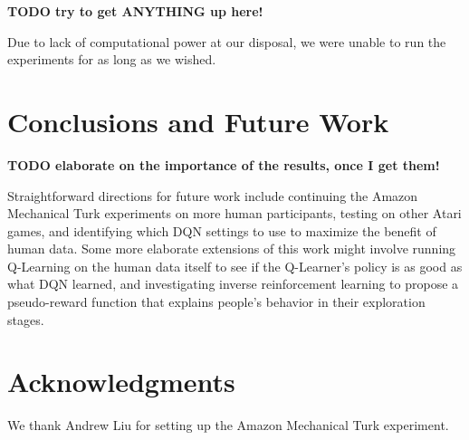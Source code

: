 \documentclass[letterpaper, 10 pt, conference]{ieeeconf}  %
\begin{document}
\textbf{TODO try to get ANYTHING up here!}

Due to lack of computational power at our disposal, we were unable to run the experiments for as
long as we wished.


\section{Conclusions and Future Work}\label{sec:conclusions}

\textbf{TODO elaborate on the importance of the results, once I get them!} 

Straightforward directions for future work include continuing the Amazon Mechanical Turk experiments
on more human participants, testing on other Atari games, and identifying which DQN settings to use
to maximize the benefit of human data. Some more elaborate extensions of this work might involve
running Q-Learning on the human data itself to see if the Q-Learner's policy is as good as what DQN
learned, and investigating inverse reinforcement learning to propose a pseudo-reward function that
explains people's behavior in their exploration stages.

\section*{Acknowledgments}

We thank Andrew Liu for setting up the Amazon Mechanical Turk experiment.



\addtolength{\textheight}{-12cm}




\end{document}
